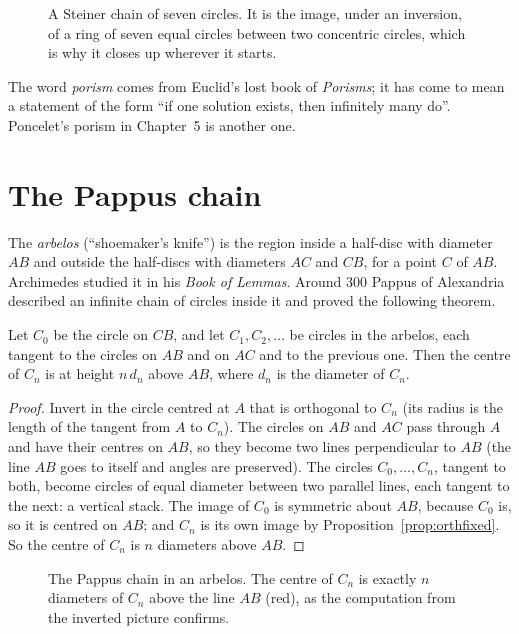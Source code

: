 \begin{figure}[ht]
\centering
{}
\caption{A Steiner chain of seven circles. It is the image, under an inversion, of a ring of seven equal circles between two concentric
circles, which is why it closes up wherever it starts.}
\label{fig:steiner}
\end{figure}

The word \emph{porism} comes from Euclid's lost book of \emph{Porisms}; it has come to mean a statement of the form ``if one solution exists, then
infinitely many do''. Poncelet's porism in Chapter~5 is another one.

\section{The Pappus chain}

The \emph{arbelos} (``shoemaker's knife'') is the region inside a half-disc with diameter $AB$ and outside the half-discs with diameters $AC$
and $CB$, for a point $C$ of $AB$. Archimedes studied it in his \emph{Book of Lemmas}. Around 300 Pappus of Alexandria described an infinite chain
of circles inside it and proved the following theorem.

\begin{theorem}[Pappus]\label{thm:pappus}
Let $C_0$ be the circle on $CB$, and let $C_1,C_2,\dots$ be circles in the arbelos, each tangent to the circles on $AB$ and on $AC$ and to the
previous one. Then the centre of $C_n$ is at height $n\,d_n$ above $AB$, where $d_n$ is the diameter of $C_n$.
\end{theorem}
\begin{proof}
Invert in the circle centred at $A$ that is orthogonal to $C_n$ (its radius is the length of the tangent from $A$ to $C_n$). The circles on
$AB$ and $AC$ pass through $A$ and have their centres on $AB$, so they become two lines perpendicular to $AB$ (the line $AB$ goes to itself and
angles are preserved). The circles $C_0,\dots,C_n$, tangent to both, become circles of equal diameter between two parallel lines, each tangent to
the next: a vertical stack. The image of $C_0$ is symmetric about $AB$, because $C_0$ is, so it is centred on $AB$; and $C_n$ is its own
image by Proposition~\ref{prop:orthfixed}. So the centre of $C_n$ is $n$ diameters above $AB$.
\end{proof}

\begin{figure}[ht]
\centering
{}
\caption{The Pappus chain in an arbelos. The centre of $C_n$ is exactly $n$ diameters of $C_n$ above the line $AB$ (red), as the computation
from the inverted picture confirms.}
\label{fig:pappus}
\end{figure}

